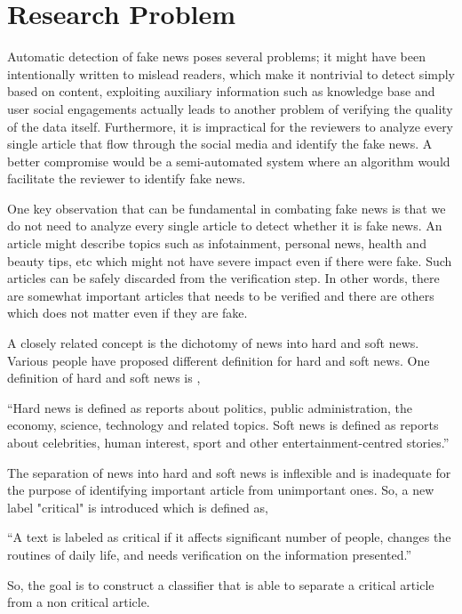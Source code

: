 \section{Research Problem} \label{intro:research}
Automatic detection of fake news poses several problems; it might have been intentionally written to mislead readers, which make it nontrivial to detect simply based on content, exploiting auxiliary information such as knowledge base and user social engagements actually leads to another problem of verifying the quality of the data itself\cite{shu2017fake}. Furthermore, it is impractical for the reviewers to analyze every single article that flow through the social media and identify the fake news. A better compromise would be a semi-automated system where an algorithm would facilitate the reviewer to identify fake news.\par
One key observation that can be fundamental in combating fake news is that we do not need to analyze every single article to detect whether it is fake news. An article might describe topics such as infotainment, personal news, health and beauty tips, etc which might not have severe impact even if there were fake. Such articles can be safely discarded from the verification step. In other words, there are somewhat important articles that needs to be verified and there are others which does not matter even if they are fake.\par
A closely related concept is the dichotomy of news into hard and soft news. Various people have proposed different definition for hard and soft news\cite{reinemann2012hard}\cite{shoemaker2012news}. One definition of hard and soft news is \cite{reinemann2012hard},

\enquote{Hard news is defined as reports about politics, public administration, the economy, science, technology and related topics. Soft news is defined as reports about celebrities, human interest, sport and other entertainment-centred stories.}

The separation of news into hard and soft news is inflexible and is inadequate for the purpose of identifying important article from unimportant ones. So, a new label "critical" is introduced which is defined as, 

\enquote{A text is labeled as critical if it affects significant number of people, changes the routines of daily life, and needs verification on the information presented.}

So, the goal is to construct a classifier that is able to separate a critical article from a non critical article.

